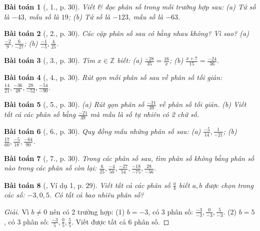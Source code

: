 \documentclass{article}
\newtheorem{baitoan}{Bài toán}
\begin{document}
\begin{baitoan}[\cite{SGK_Toan_6_Canh_Dieu_tap_2}, 1., p. 30]
	Viết \& đọc phân số trong mỗi trường hợp sau: (a) Tử số là $-43$, mẫu số là $19$; (b) Tử số là $-123$, mẫu số là $-63$.
\end{baitoan}

\begin{baitoan}[\cite{SGK_Toan_6_Canh_Dieu_tap_2}, 2., p. 30]
	Các cặp phân số sau có bằng nhau không? Vì sao? (a) $\frac{-2}{9},\frac{6}{-27}$;  (b) $\frac{-1}{-5},\frac{4}{25}$.
\end{baitoan}

\begin{baitoan}[\cite{SGK_Toan_6_Canh_Dieu_tap_2}, 3., p. 30]
	Tìm $x\in\mathbb{Z}$ biết: (a) $\frac{-28}{35} = \frac{16}{x}$; (b) $\frac{x + 7}{15} = \frac{-24}{36}$.	
\end{baitoan}

\begin{baitoan}[\cite{SGK_Toan_6_Canh_Dieu_tap_2}, 4., p. 30]
	Rút gọn mỗi phân số sau về phân số tối giản: $\frac{14}{21},\frac{-36}{48},\frac{28}{-52},\frac{-54}{-90}$.
\end{baitoan}

\begin{baitoan}[\cite{SGK_Toan_6_Canh_Dieu_tap_2}, 5., p. 30]
	(a) Rút gọn phân số $\frac{-21}{39}$ về phân số tối giản. (b) Viết tất cả các phân số bằng $\frac{-21}{39}$ mà mẫu là số tự nhiên có 2 chữ số.
\end{baitoan}

\begin{baitoan}[\cite{SGK_Toan_6_Canh_Dieu_tap_2}, 6., p. 30]
	Quy đồng mẫu những phân số sau: (a) $\frac{-5}{14},\frac{1}{-21}$; (b) $\frac{17}{60},\frac{-5}{18},\frac{-64}{90}$.
\end{baitoan}

\begin{baitoan}[\cite{SGK_Toan_6_Canh_Dieu_tap_2}, 7., p. 30]
	Trong các phân số sau, tìm phân số không bằng phân số nào trong các phân số còn lại: $\frac{6}{25},\frac{-4}{50},\frac{-27}{54},\frac{-18}{-75},\frac{28}{-56}$.
\end{baitoan}

\begin{baitoan}[\cite{SBT_Toan_6_Canh_Dieu_tap_2}, Ví dụ 1, p. 29]
	Viết tất cả các phân số $\frac{a}{b}$ biết $a,b$ được chọn trong các số: $-3,0,5$. Có tất cả bao nhiêu phân số?
\end{baitoan}

\begin{proof}[Giải]
	Vì $b\ne0$ nên có 2 trường hợp: (1) $b = -3$, có 3 phân số: $\frac{-3}{-3},\frac{0}{-3},\frac{5}{-3}$. (2) $b = 5$, có $3$ phân số: $\frac{-3}{5},\frac{0}{5},\frac{5}{5}$. Viết được tất cả $6$ phân số.
\end{proof}
\end{document}
